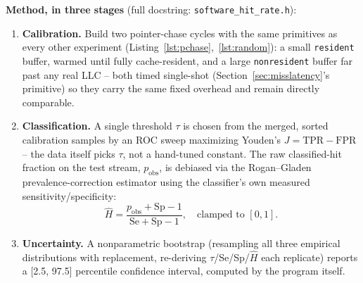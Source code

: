 \documentclass{article}
\begin{document}
\textbf{Method, in three stages} (full docstring: \texttt{software\_hit\_rate.h}):
\begin{enumerate}
    \item \textbf{Calibration.} Build two pointer-chase cycles with the same primitives as
    every other experiment (Listing~\ref{lst:pchase},~\ref{lst:random}): a small
    \texttt{resident} buffer, warmed until fully cache-resident, and a large
    \texttt{nonresident} buffer far past any real LLC -- both timed single-shot
    (Section~\ref{sec:misslatency}'s primitive) so they carry the same fixed overhead and
    remain directly comparable.
    \item \textbf{Classification.} A single threshold $\tau$ is chosen from the merged,
    sorted calibration samples by an ROC sweep maximizing Youden's $J = \text{TPR} -
    \text{FPR}$ -- the data itself picks $\tau$, not a hand-tuned constant. The raw
    classified-hit fraction on the test stream, $p_{\text{obs}}$, is debiased via the
    Rogan--Gladen prevalence-correction estimator using the classifier's own measured
    sensitivity/specificity:
    \[ \widehat{H} = \frac{p_{\text{obs}} + \text{Sp} - 1}{\text{Se} + \text{Sp} - 1},
    \quad \text{clamped to } [0,1]. \]
    \item \textbf{Uncertainty.} A nonparametric bootstrap (resampling all three empirical
    distributions with replacement, re-deriving $\tau$/Se/Sp/$\widehat{H}$ each replicate)
    reports a [2.5, 97.5] percentile confidence interval, computed by the program itself.
\end{enumerate}
\end{document}
